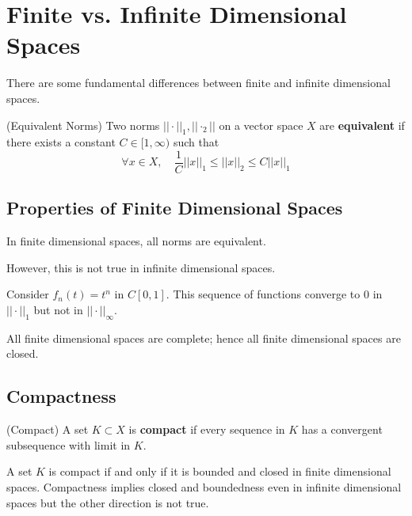 \documentclass{article}
\begin{document}
\section{Finite vs. Infinite Dimensional Spaces}  

There are some fundamental differences between finite and infinite dimensional spaces.  

\begin{defn}
    (Equivalent Norms)
    Two norms $||\cdot||_1, ||\cdot_2||$ on a vector space $X$ are \textbf{equivalent} 
    if there exists a constant $C \in [1, \infty)$ such that  
    \begin{equation*}
        \forall x \in X, \quad \frac{1}{C}||x||_1 \leq ||x||_2 \leq C||x||_1
    \end{equation*}
\end{defn}  

\subsection{Properties of Finite Dimensional Spaces}

\begin{thm}
    In finite dimensional spaces, all norms are equivalent.
\end{thm}  

However, this is not true in infinite dimensional spaces.  

\begin{eg}
    Consider $f_n(t)=t^n$ in $C[0,1]$. This sequence of functions converge to $0$ 
    in $||\cdot||_1$ but not in $||\cdot||_{\infty}$.
\end{eg}

\begin{prop}
    All finite dimensional spaces are complete; hence all finite dimensional spaces are closed.
\end{prop}  

\subsection{Compactness}
\begin{defn}
    (Compact) 
    A set $K \subset X$ is \textbf{compact} 
    if every sequence in $K$ has a convergent subsequence with limit in $K$.
\end{defn}  

\begin{remark}
    A set $K$ is compact if and only if it is bounded and closed in finite dimensional spaces.  
    Compactness implies closed and boundedness even in infinite dimensional spaces but the 
    other direction is not true.
\end{remark}  
\end{document}
